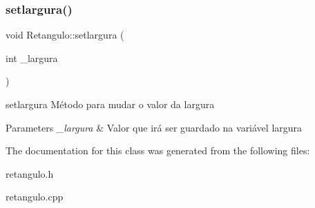 \subsubsection{\texorpdfstring{setlargura()}{setlargura()}}
{\footnotesize\ttfamily void Retangulo\+::setlargura (\begin{DoxyParamCaption}\item[{int}]{\+\_\+largura }\end{DoxyParamCaption})}



setlargura Método para mudar o valor da largura 


\begin{DoxyParams}{Parameters}
{\em \+\_\+largura} & Valor que irá ser guardado na variável largura \\
\hline
\end{DoxyParams}


The documentation for this class was generated from the following files\+:\begin{DoxyCompactItemize}
\item 
retangulo.\+h\item 
retangulo.\+cpp\end{DoxyCompactItemize}
